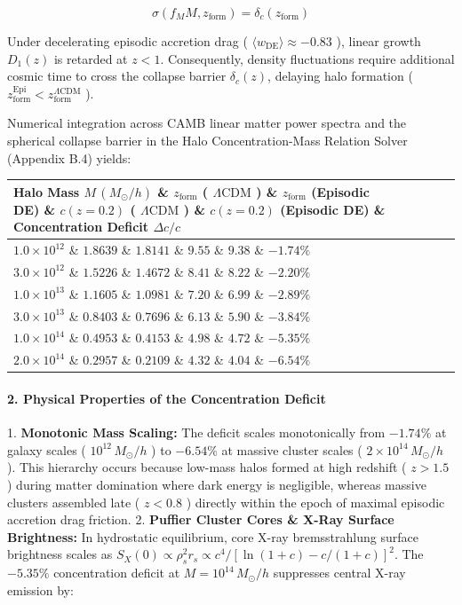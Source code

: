 \documentclass[11pt,a4paper]{article}
\theoremstyle{definition}\newtheorem{definition}{Definition}
\theoremstyle{remark}\newtheorem{remark}{Remark}
\begin{document}
\begin{equation}
\sigma(f_M M, z_{\text{form}}) = \delta_c(z_{\text{form}})
\end{equation}


Under decelerating episodic accretion drag ( $\langle w_{\text{DE}} \rangle \approx -0.83$ ), linear growth $D_1(z)$ is retarded at $z < 1$. Consequently, density fluctuations require additional cosmic time to cross the collapse barrier $\delta_c(z)$, delaying halo formation ( $z_{\text{form}}^{\text{Epi}} < z_{\text{form}}^{\Lambda\text{CDM}}$ ).

Numerical integration across CAMB linear matter power spectra and the spherical collapse barrier in the Halo Concentration-Mass Relation Solver (Appendix B.4) yields:

\begin{longtable}{llllll}
\hline
Halo Mass $M \, (M_\odot/h)$ \& $z_{\text{form}}$ ( $\Lambda\text{CDM}$ ) \& $z_{\text{form}}$ (Episodic DE) \& $c(z=0.2)$ ( $\Lambda\text{CDM}$ ) \& $c(z=0.2)$ (Episodic DE) \& Concentration Deficit $\Delta c / c$ \\
\hline
$1.0 \times 10^{12}$ \& $1.8639$ \& $1.8141$ \& $9.55$ \& $9.38$ \& \textbf{$-1.74\%$} \\
$3.0 \times 10^{12}$ \& $1.5226$ \& $1.4672$ \& $8.41$ \& $8.22$ \& \textbf{$-2.20\%$} \\
$1.0 \times 10^{13}$ \& $1.1605$ \& $1.0981$ \& $7.20$ \& $6.99$ \& \textbf{$-2.89\%$} \\
$3.0 \times 10^{13}$ \& $0.8403$ \& $0.7696$ \& $6.13$ \& $5.90$ \& \textbf{$-3.84\%$} \\
$1.0 \times 10^{14}$ \& $0.4953$ \& $0.4153$ \& $4.98$ \& $4.72$ \& \textbf{$-5.35\%$} \\
$2.0 \times 10^{14}$ \& $0.2957$ \& $0.2109$ \& $4.32$ \& $4.04$ \& \textbf{$-6.54\%$} \\
\hline
\end{longtable}\paragraph{2. Physical Properties of the Concentration Deficit}

1. \textbf{Monotonic Mass Scaling:} The deficit scales monotonically from $-1.74\%$ at galaxy scales ( $10^{12} \, M_\odot/h$ ) to $-6.54\%$ at massive cluster scales ( $2 \times 10^{14} \, M_\odot/h$ ). This hierarchy occurs because low-mass halos formed at high redshift ( $z > 1.5$ ) during matter domination where dark energy is negligible, whereas massive clusters assembled late ( $z < 0.8$ ) directly within the epoch of maximal episodic accretion drag friction.
2. \textbf{Puffier Cluster Cores \& X-Ray Surface Brightness:} In hydrostatic equilibrium, core X-ray bremsstrahlung surface brightness scales as $S_X(0) \propto \rho_s^2 r_s \propto c^4 / [\ln(1+c) - c/(1+c)]^2$. The $-5.35\%$ concentration deficit at $M = 10^{14} \, M_\odot/h$ suppresses central X-ray emission by:
\end{document}
